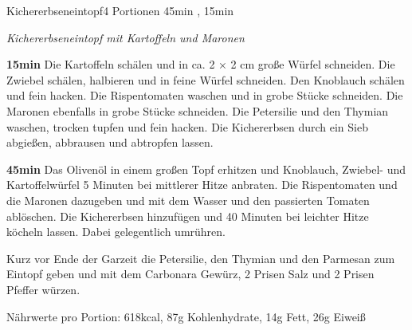 \documentclass[../recipe-collections/cooking.tex]{subfiles}
\begin{document}
\begin{recipe}{Kichererbseneintopf}{4 Portionen }{45min , 15min }

  \freeform{}\textit{Kichererbseneintopf mit Kartoffeln und Maronen}


  \textbf{15min}
  Die Kartoffeln schälen und in ca. 2 × 2 cm große Würfel schneiden.
  Die Zwiebel schälen, halbieren und in feine Würfel schneiden.
  Den Knoblauch schälen und fein hacken.
  Die Rispentomaten waschen und in grobe Stücke schneiden.
  Die Maronen ebenfalls in grobe Stücke schneiden.
  Die Petersilie und den Thymian waschen, trocken tupfen und fein hacken.
  Die Kichererbsen durch ein Sieb abgießen, abbrausen und abtropfen lassen.


  \textbf{45min}
  Das Olivenöl in einem großen Topf erhitzen und Knoblauch, Zwiebel- und Kartoffelwürfel 5 Minuten bei mittlerer Hitze anbraten.
  Die Rispentomaten und die Maronen dazugeben und mit dem Wasser und den passierten Tomaten ablöschen.
  Die Kichererbsen hinzufügen und 40 Minuten bei leichter Hitze köcheln lassen.
  Dabei gelegentlich umrühren.


  Kurz vor Ende der Garzeit die Petersilie, den Thymian und den Parmesan zum Eintopf geben und mit dem Carbonara Gewürz, 2 Prisen Salz und 2 Prisen Pfeffer würzen.

  \freeform{}\hrulefill{}

  \freeform{}
  Nährwerte pro Portion: 618kcal, 87g Kohlenhydrate, 14g Fett, 26g Eiweiß

\end{recipe}
\end{document}
